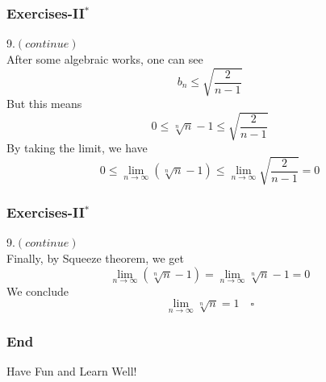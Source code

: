 \documentclass[12pt, t]{beamer}
\begin{document}
\begin{frame}
    \frametitle{Exercises-II$^*$}
    9.$(continue)$\\
    \hspace{1em} After some algebraic works, one can see
    \begin{equation*}
        b_n\leq\sqrt{\frac{2}{n-1}}
    \end{equation*}
    \hspace{1em} But this means
    \begin{equation*}
        0\leq \sqrt[n]{n}-1\leq \sqrt{\frac{2}{n-1}}
    \end{equation*}
    \hspace{1em} By taking the limit, we have
    \begin{equation*}
        0\leq \lim_{n\rightarrow\infty}(\sqrt[n]{n}-1)\leq \lim_{n\rightarrow\infty}\sqrt{\frac{2}{n-1}}=0
    \end{equation*}
\end{frame}

\begin{frame}
    \frametitle{Exercises-II$^*$}
    9.$(continue)$\\
    \hspace{1em} Finally, by Squeeze theorem, we get
    \begin{equation*}
        \lim_{n\rightarrow\infty}(\sqrt[n]{n}-1)=\lim_{n\rightarrow\infty}\sqrt[n]{n}-1=0
    \end{equation*}
    \hspace{1em} We conclude
    \begin{equation*}
        \lim_{n\rightarrow\infty}\sqrt[n]{n}=1\quad\square
    \end{equation*}
\end{frame}


\begin{frame}
    \frametitle{End}
    \vspace{2cm}
    \Huge \center  Have Fun and Learn Well!
\end{frame}
\end{document}
